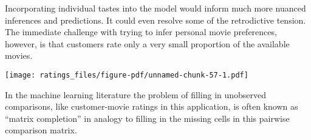 \documentclass[
  letterpaper,
  DIV=11,
  numbers=noendperiod]{scrartcl}
\newenvironment{Shaded}{\begin{snugshade}}{\end{snugshade}}
\newcommand{\AttributeTok}[1]{\textcolor[rgb]{0.40,0.45,0.13}{#1}}
\newcommand{\ControlFlowTok}[1]{\textcolor[rgb]{0.00,0.23,0.31}{#1}}
\newcommand{\DecValTok}[1]{\textcolor[rgb]{0.68,0.00,0.00}{#1}}
\newcommand{\FunctionTok}[1]{\textcolor[rgb]{0.28,0.35,0.67}{#1}}
\newcommand{\NormalTok}[1]{\textcolor[rgb]{0.00,0.23,0.31}{#1}}
\newcommand{\OtherTok}[1]{\textcolor[rgb]{0.00,0.23,0.31}{#1}}
\newcommand{\SpecialCharTok}[1]{\textcolor[rgb]{0.37,0.37,0.37}{#1}}
\newcommand{\StringTok}[1]{\textcolor[rgb]{0.13,0.47,0.30}{#1}}
\begin{document}
Incorporating individual tastes into the model would inform much more
nuanced inferences and predictions. It could even resolve some of the
retrodictive tension. The immediate challenge with trying to infer
personal movie preferences, however, is that customers rate only a very
small proportion of the available movies.

\begin{Shaded}
\end{Shaded}

\texttt{[image: ratings\_files/figure-pdf/unnamed-chunk-57-1.pdf]}

In the machine learning literature the problem of filling in unobserved
comparisons, like customer-movie ratings in this application, is often
known as ``matrix completion'' in analogy to filling in the missing
cells in this pairwise comparison matrix.
\end{document}
